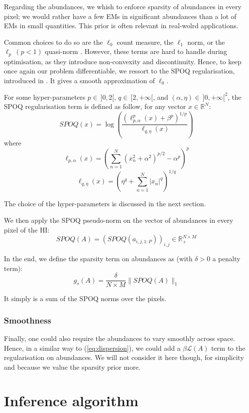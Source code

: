 \documentclass{article}
\begin{document}
Regarding the abundances, we whish to enforce sparsity of abundances in every pixel; we would rather have a few EMs in significant abundances than a lot of EMs in small quantities. This prior is often relevant in real-wolrd applications.

Common choices to do so are the $\ell_0$ count measure, the $\ell_1$ norm, or the $\ell_p \ (p<1)$ quasi-norm \citep{natarajan1995}. However, these terms are hard to handle during optimisation, as they introduce non-convexity and discontinuity. Hence, to keep once again our problem differentiable, we ressort to the SPOQ regularisation, introduced in \citet{cherni_spoq_2020}. It gives a smooth approximation of $\ell_0$.

For some hyper-parameters $p\in \, ]0, 2[$, $q\in \, [2, +\infty[$, and $(\alpha, \eta) \in \, ]0, +\infty [^2$, the SPOQ regularisation term is defined as follow, for any vector $x \in \mathbb{R}^N$:
$$SPOQ(x) = \log \left( \frac{(\ell_{p,\alpha}^p (x) + \beta^p)^{1/p}}{\ell_{q,\eta} (x)} \right)$$
        where
        $$\ell_{p,\alpha} (x) = \left( \sum_{n=1}^N (x_n^2 + \alpha^2)^{p/2} - \alpha^p \right)^p$$
        $$\ell_{q,\eta} (x) = \left( \eta^q + \sum_{n=1}^N |x_n|^q \right)^{1/q}$$

The choice of the hyper-parameters is discussed in the next section.

We then apply the SPOQ pseudo-norm on the vector of abundances in every pixel of the HI:
$$SPOQ(A) = (SPOQ(a_{i,j,1:P}))_{i, j} \in \mathbb{R}_+^{N \times M}$$

In the end, we define the sparsity term on abundances as (with $\delta > 0$ a penalty term):
\begin{equation}\label{eq:g_s}
  g_s(A) = \frac{\delta}{N \times M} \| SPOQ(A) \|_{1}
\end{equation}

It simply is a sum of the SPOQ norms over the pixels.

\subsubsection{Smoothness}
Finally, one could also require the abundances to vary smoothly across space. Hence, in a similar way to (\ref{eq:dispersion}), we could add a $\beta \mathcal{L}(A)$ term to the regularisation on abundances. We will not consider it here though, for simplicity and because we value the sparsity prior more.


\section{Inference algorithm}\label{sec:algo}
\end{document}
